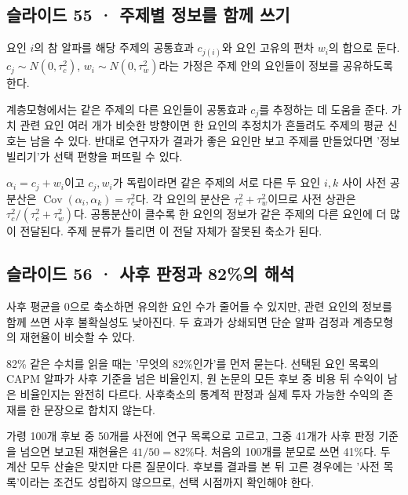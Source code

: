 \documentclass[11pt,a4paper]{article}
\begin{document}
\subsection{슬라이드 55 · 주제별 정보를 함께 쓰기}
요인 $i$의 참 알파를 해당 주제의 공통효과 $c_{j(i)}$와 요인 고유의 편차 $w_i$의 합으로 둔다. $c_j\sim N(0,\tau_c^2)$, $w_i\sim N(0,\tau_w^2)$라는 가정은 주제 안의 요인들이 정보를 공유하도록 한다.\par

계층모형에서는 같은 주제의 다른 요인들이 공통효과 $c_j$를 추정하는 데 도움을 준다. 가치 관련 요인 여러 개가 비슷한 방향이면 한 요인의 추정치가 흔들려도 주제의 평균 신호는 남을 수 있다. 반대로 연구자가 결과가 좋은 요인만 보고 주제를 만들었다면 '정보 빌리기'가 선택 편향을 퍼뜨릴 수 있다.\par

$\alpha_i=c_j+w_i$이고 $c_j,w_i$가 독립이라면 같은 주제의 서로 다른 두 요인 $i,k$ 사이 사전 공분산은 $\operatorname{Cov}(\alpha_i,\alpha_k)=\tau_c^2$다. 각 요인의 분산은 $\tau_c^2+\tau_w^2$이므로 사전 상관은 $\tau_c^2/(\tau_c^2+\tau_w^2)$다. 공통분산이 클수록 한 요인의 정보가 같은 주제의 다른 요인에 더 많이 전달된다. 주제 분류가 틀리면 이 전달 자체가 잘못된 축소가 된다.\par

\subsection{슬라이드 56 · 사후 판정과 82\%의 해석}
사후 평균을 0으로 축소하면 유의한 요인 수가 줄어들 수 있지만, 관련 요인의 정보를 함께 쓰면 사후 불확실성도 낮아진다. 두 효과가 상쇄되면 단순 알파 검정과 계층모형의 재현율이 비슷할 수 있다.\par

82\% 같은 수치를 읽을 때는 '무엇의 82\%인가'를 먼저 묻는다. 선택된 요인 목록의 CAPM 알파가 사후 기준을 넘은 비율인지, 원 논문의 모든 후보 중 비용 뒤 수익이 남은 비율인지는 완전히 다르다. 사후축소의 통계적 판정과 실제 투자 가능한 수익의 존재를 한 문장으로 합치지 않는다.\par

가령 100개 후보 중 50개를 사전에 연구 목록으로 고르고, 그중 41개가 사후 판정 기준을 넘으면 보고된 재현율은 $41/50=82\%$다. 처음의 100개를 분모로 쓰면 41\%다. 두 계산 모두 산술은 맞지만 다른 질문이다. 후보를 결과를 본 뒤 고른 경우에는 '사전 목록'이라는 조건도 성립하지 않으므로, 선택 시점까지 확인해야 한다.\par
\end{document}
